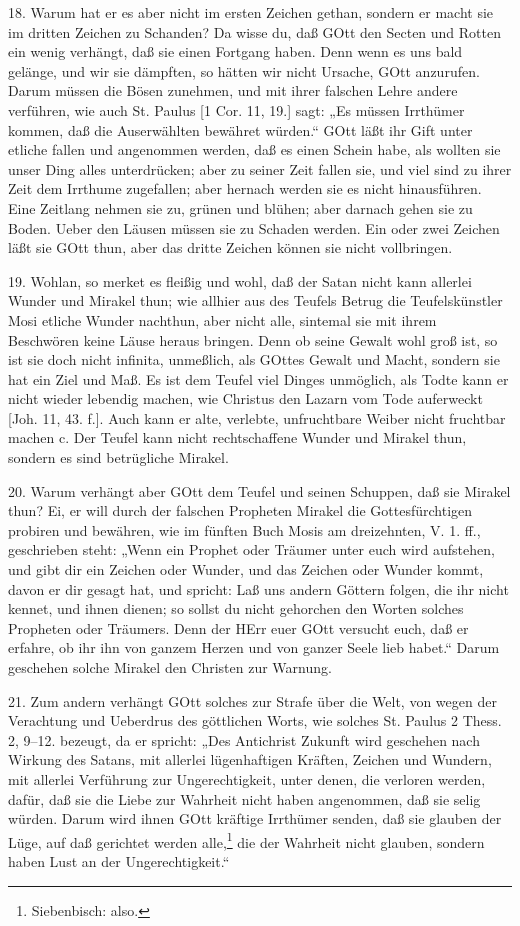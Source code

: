 18. Warum hat er es aber nicht im ersten Zeichen gethan, sondern er macht sie im dritten Zeichen zu Schanden? Da wisse du, daß GOtt den Secten und Rotten ein wenig verhängt, daß sie einen Fortgang haben. Denn wenn es uns bald gelänge, und wir sie dämpften, so hätten wir nicht Ursache, GOtt anzurufen. Darum müssen die Bösen zunehmen, und mit ihrer falschen Lehre andere verführen, wie auch St. Paulus [1 Cor. 11, 19.] sagt: „Es müssen Irrthümer kommen, daß die Auserwählten bewähret
würden.“ GOtt läßt ihr Gift unter etliche fallen und angenommen werden, daß es einen Schein habe, als wollten sie unser Ding alles unterdrücken; aber zu seiner Zeit fallen sie, und viel sind zu ihrer Zeit dem Irrthume zugefallen; aber hernach werden sie es nicht hinausführen. Eine Zeitlang nehmen sie zu, grünen und blühen; aber darnach gehen sie zu Boden. Ueber den Läusen müssen sie zu Schaden werden. Ein oder zwei Zeichen läßt sie GOtt thun, aber das dritte Zeichen können sie nicht vollbringen.

19. Wohlan, so merket es fleißig und wohl, daß der Satan nicht kann allerlei Wunder und Mirakel thun; wie allhier aus des Teufels Betrug die Teufelskünstler Mosi etliche Wunder nachthun, aber nicht alle, sintemal sie mit ihrem Beschwören keine Läuse heraus bringen. Denn ob seine Gewalt wohl groß ist, so ist sie doch nicht infinita, unmeßlich, als GOttes Gewalt und Macht, sondern sie hat ein Ziel und Maß. Es ist dem Teufel viel Dinges unmöglich, als Todte kann er nicht wieder lebendig machen, wie Christus den Lazarn vom Tode auferweckt [Joh. 11, 43. f.]. Auch kann er alte, verlebte, unfruchtbare Weiber nicht fruchtbar machen c. Der Teufel kann nicht rechtschaffene Wunder und Mirakel thun, sondern es sind betrügliche Mirakel.

20. Warum verhängt aber GOtt dem Teufel und seinen Schuppen, daß sie Mirakel thun? Ei, er will durch der falschen Propheten Mirakel die Gottesfürchtigen probiren und bewähren, wie im fünften Buch Mosis am dreizehnten, V. 1. ff., geschrieben steht: „Wenn ein Prophet oder Träumer unter euch wird aufstehen, und gibt dir ein Zeichen oder Wunder, und das Zeichen oder Wunder kommt, davon er dir gesagt hat, und spricht: Laß uns andern Göttern folgen, die ihr nicht kennet, und ihnen dienen; so sollst du nicht gehorchen den Worten solches Propheten oder Träumers. Denn der HErr euer GOtt versucht euch, daß er erfahre, ob ihr ihn von ganzem Herzen und von ganzer Seele lieb habet.“ Darum geschehen solche Mirakel den Christen zur Warnung.

21. Zum andern verhängt GOtt solches zur Strafe über die Welt, von wegen der Verachtung und Ueberdrus des göttlichen Worts, wie solches St. Paulus 2 Thess. 2, 9–12. bezeugt, da er spricht: „Des Antichrist Zukunft wird geschehen nach Wirkung des Satans, mit allerlei lügenhaftigen Kräften, Zeichen und Wundern, mit allerlei Verführung zur Ungerechtigkeit, unter denen, die verloren werden, dafür, daß sie die Liebe zur Wahrheit nicht haben angenommen, daß sie selig würden. Darum wird ihnen GOtt kräftige Irrthümer senden, daß sie glauben der Lüge, auf daß gerichtet werden alle,\footnote{Siebenbisch: also.} die der Wahrheit nicht glauben, sondern haben Lust an der Ungerechtigkeit.“

